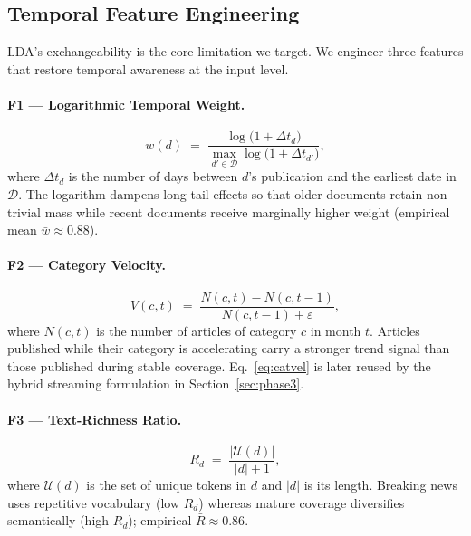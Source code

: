 \documentclass[10pt,twocolumn,a4paper]{article}
\begin{document}
\subsection{Temporal Feature Engineering}
\label{sec:features}

LDA's exchangeability is the core limitation we target. We engineer three features that restore temporal awareness at the input level.

\paragraph{F1 --- Logarithmic Temporal Weight.}
\begin{equation}
\label{eq:tw}
w(d) \;=\; \frac{\log\!\bigl(1 + \Delta t_d\bigr)}{\displaystyle\max_{d' \in \mathcal{D}}\log\!\bigl(1 + \Delta t_{d'}\bigr)},
\end{equation}
where $\Delta t_d$ is the number of days between $d$'s publication and the earliest date in $\mathcal{D}$. The logarithm dampens long-tail effects so that older documents retain non-trivial mass while recent documents receive marginally higher weight (empirical mean $\bar w \approx 0.88$).

\paragraph{F2 --- Category Velocity.}
\begin{equation}
\label{eq:catvel}
V(c, t) \;=\; \frac{N(c, t) - N(c, t{-}1)}{N(c, t{-}1) + \varepsilon},
\end{equation}
where $N(c,t)$ is the number of articles of category $c$ in month $t$. Articles published while their category is accelerating carry a stronger trend signal than those published during stable coverage.
Eq.~\eqref{eq:catvel} is later reused by the hybrid streaming formulation in Section~\ref{sec:phase3}.

\paragraph{F3 --- Text-Richness Ratio.}
\begin{equation}
\label{eq:rich}
R_d \;=\; \frac{|\mathcal{U}(d)|}{|d| + 1},
\end{equation}
where $\mathcal{U}(d)$ is the set of unique tokens in $d$ and $|d|$ is its length. Breaking news uses repetitive vocabulary (low $R_d$) whereas mature coverage diversifies semantically (high $R_d$); empirical $\bar R \approx 0.86$.
\end{document}

